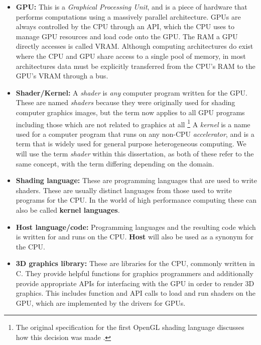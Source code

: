 \documentclass[a4paper,12pt,twoside,openright]{report}
\begin{document}
\begin{itemize}

    \item \textbf{GPU:} This is a \textit{Graphical Processing Unit}, and is a
    piece of hardware that performs computations using a massively parallel
    architecture. GPUs are always controlled by the CPU through an API, which
    the CPU uses to manage GPU resources and load code onto the GPU. The RAM a
    GPU directly accesses is called VRAM. Although computing architectures do
    exist where the CPU and GPU share access to a single pool of memory, in
    most architectures data must be explicitly transferred from the CPU's RAM
    to the GPU's VRAM through a bus.

    \item \textbf{Shader/Kernel:} A \textit{shader} is \textit{any} computer
    program written for the GPU. These are named \textit{shaders} because they
    were originally used for shading computer graphics images, but the term now
    applies to all GPU programs including those which are not related to
    graphics at all \footnote{The original specification for the first OpenGL
    shading language discusses how this decision was made \cite{GLSL_1_10}.} A
    \textit{kernel} is a name used for a computer program that runs on any
    non-CPU \textit{accelerator}, and is a term that is widely used for general
    purpose heterogeneous computing. We will use the term \textit{shader}
    within this dissertation, as both of these refer to the same concept, with
    the term differing depending on the domain.

    \item \textbf{Shading language:} These are programming languages that are
    used to write shaders. These are usually distinct languages from those used
    to write programs for the CPU. In the world of high performance computing
    these can also be called \textbf{kernel languages}.

    \item \textbf{Host language/code:} Programming languages and the resulting
    code which is written for and runs on the CPU. \textbf{Host} will also be
    used as a synonym for the CPU.

    \item \textbf{3D graphics library:} These are libraries for the CPU,
    commonly written in C. They provide helpful functions for graphics
    programmers and additionally provide appropriate APIs for interfacing with
    the GPU in order to render 3D graphics. This includes function and API
    calls to load and run shaders on the GPU, which are implemented by the
    drivers for GPUs.


\end{itemize}
\end{document}
